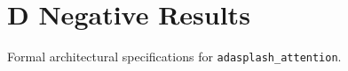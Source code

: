 \section{D Negative Results}

Formal architectural specifications for \texttt{adasplash_attention}.
